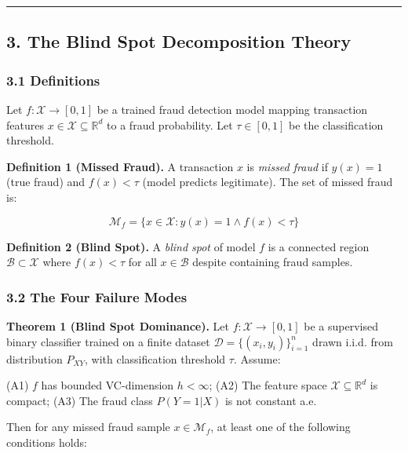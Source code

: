 \documentclass[
  11pt,
]{article}
\begin{document}
\begin{center}\rule{0.5\linewidth}{0.5pt}\end{center}

\subsection{3. The Blind Spot Decomposition
Theory}\label{the-blind-spot-decomposition-theory}

\subsubsection{3.1 Definitions}\label{definitions}

Let \(f: \mathcal{X} \to [0,1]\) be a trained fraud detection model
mapping transaction features
\(x \in \mathcal{X} \subseteq \mathbb{R}^d\) to a fraud probability. Let
\(\tau \in [0,1]\) be the classification threshold.

\textbf{Definition 1 (Missed Fraud).} A transaction \(x\) is
\emph{missed fraud} if \(y(x) = 1\) (true fraud) and \(f(x) < \tau\)
(model predicts legitimate). The set of missed fraud is:

\[\mathcal{M}_f = \{x \in \mathcal{X} : y(x) = 1 \wedge f(x) < \tau\}\]

\textbf{Definition 2 (Blind Spot).} A \emph{blind spot} of model \(f\)
is a connected region \(\mathcal{B} \subset \mathcal{X}\) where
\(f(x) < \tau\) for all \(x \in \mathcal{B}\) despite containing fraud
samples.

\subsubsection{3.2 The Four Failure Modes}\label{the-four-failure-modes}

\textbf{Theorem 1 (Blind Spot Dominance).} Let
\(f: \mathcal{X} \to [0,1]\) be a supervised binary classifier trained
on a finite dataset \(\mathcal{D} = \{(x_i, y_i)\}_{i=1}^n\) drawn
i.i.d. from distribution \(P_{XY}\), with classification threshold
\(\tau\). Assume:

(A1) \(f\) has bounded VC-dimension \(h < \infty\); (A2) The feature
space \(\mathcal{X} \subseteq \mathbb{R}^d\) is compact; (A3) The fraud
class \(P(Y=1|X)\) is not constant a.e.

Then for any missed fraud sample \(x \in \mathcal{M}_f\), at least one
of the following conditions holds:
\end{document}

